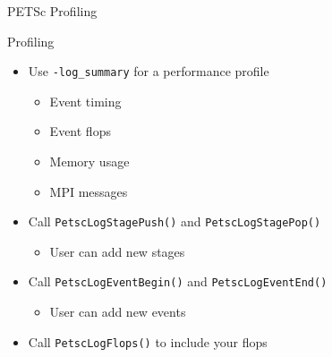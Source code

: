 \begin{frame}[fragile]{PETSc Profiling}

\begin{block}{Profiling}
\begin{itemize}
  \item Use \lstinline|-log_summary| for a performance profile
  \begin{itemize}
    \item Event timing
    \item Event flops
    \item Memory usage
    \item MPI messages
  \end{itemize}

  \item Call \lstinline|PetscLogStagePush()| and \lstinline|PetscLogStagePop()|
  \begin{itemize}
    \item User can add new stages
  \end{itemize}

  \item Call \lstinline|PetscLogEventBegin()| and \lstinline|PetscLogEventEnd()|
  \begin{itemize}
    \item User can add new events
  \end{itemize}

  \item Call \lstinline|PetscLogFlops()| to include your flops
\end{itemize}
\end{block}

\end{frame}
